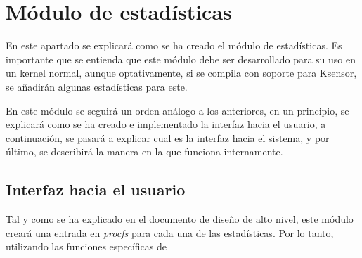 \chapter{Módulo de estadísticas}

En este apartado se explicará como se ha creado el módulo de estadísticas. Es importante que se entienda que este módulo debe ser desarrollado para su uso en un kernel normal, aunque optativamente, si se compila con soporte para Ksensor, se añadirán algunas estadísticas para este.

En este módulo se seguirá un orden análogo a los anteriores, en un principio, se explicará como se ha creado e implementado la interfaz hacia el usuario, a continuación, se pasará a explicar cual es la interfaz hacia el sistema, y por último, se describirá la manera en la que funciona internamente.

\section{Interfaz hacia el usuario}

Tal y como se ha explicado en el documento de diseño de alto nivel, este módulo creará una entrada en \textit{procfs} para cada una de las estadísticas. Por lo tanto, utilizando las funciones específicas de
